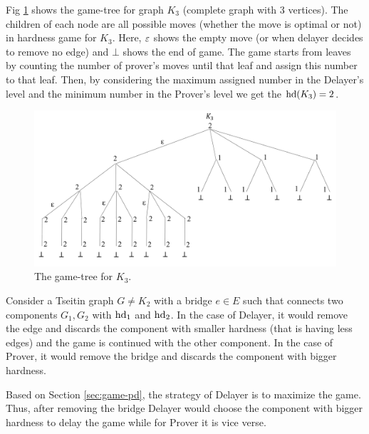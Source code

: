 \documentclass{report}
\begin{document}
\begin{examp}\label{exp:gg1}
Fig \ref{fig:gg1} shows the game-tree for graph $K_3$ (complete graph with 3 vertices). The children of each node are all possible moves (whether the move is optimal or not) in hardness game for $K_3$. Here, $\varepsilon $ shows the empty move (or when delayer decides to remove no edge) and $\bot$ shows the end of game. The game starts from leaves by counting the number of prover's moves until that leaf and assign this number to that leaf. Then, by considering the maximum assigned number in the Delayer's level and the minimum number in the Prover's level we get the $\operatorname{hd}(K_3)=2$.
   \begin{figure}
   \begin{center}
   \includegraphics[scale =0.45]{gg1.png}
   \caption{The game-tree for $K_3$.}
   \label{fig:gg1}
   \end{center}
   \end{figure}
\end{examp}

\begin{lem}\label{lem:tseitin-game-bridge}
Consider a Tseitin graph $G \not = K_2$ with a bridge $e \in E$ such that connects two components $G_1,G_2$ with $\operatorname{hd}_1$ and $\operatorname{hd}_2$. In the case of Delayer, it would remove the edge and discards the component with smaller hardness (that is having less edges) and the game is continued with the other component. In the case of Prover, it would remove the bridge and discards the component with bigger hardness.
\end{lem}
\begin{prf}
Based on Section \ref{sec:game-pd}, the strategy of Delayer is to maximize the game. Thus, after removing the bridge Delayer would choose the component with bigger hardness to delay the game while for Prover it is vice verse.
\end{prf}
\end{document}
